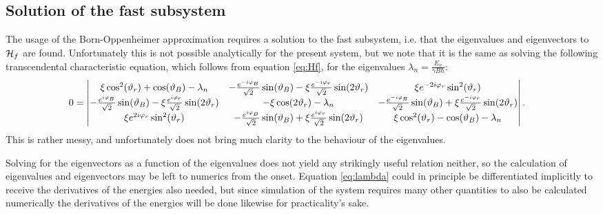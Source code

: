 \documentclass[a4paper]{article}
\begin{document}
\subsection{Solution of the fast subsystem} %
The usage of the Born-Oppenheimer approximation requires a solution to the fast subsystem,
i.e. that the eigenvalues and eigenvectors to \(\mathbb{\cal H}_f\) are found.
Unfortunately this is not possible analytically for the present system, but we note that it
is the same as solving the following transcendental characteristic equation, which follows
from equation \ref{eq:Hf}, for the
eigenvalues \(\lambda_n = \frac{E_n}{\gamma B\hbar{}}\): %
\begin{align}\label{eq:lambda}
        0 &= \mdet{
                 \xi\cos[2](\vartheta_r) + \cos(\vartheta_B) - \lambda_n& -\frac{
                        e^{-i\varphi_B}}{\sqrt{2}
                }\sin(\vartheta_B) - \xi\frac{e^{-i\varphi_r}}{\sqrt{2} }\sin(2\vartheta_r) &
                \xi e^{-2i\varphi_r}\sin[2](\vartheta_r)\\
                 -\frac{e^{i\varphi_B}}{\sqrt{2}}\sin(\vartheta_B) -
                \xi \frac{e^{i\varphi_r}}{\sqrt{2} }\sin(2\vartheta_r) &
                -\xi\cos(2\vartheta_r) - \lambda_n & -\frac{
                e^{-i\varphi_B}}{\sqrt{2} }\sin(\vartheta_B)+ \xi\frac{e^{-i\varphi_r}}{\sqrt{2}
        }\sin(2\vartheta_r)\\
                \xi e^{2i\varphi_r}\sin[2](\vartheta_r) & -\frac{
                e^{i\varphi_B}}{\sqrt{2} }\sin(\vartheta_B) +
                        \xi \frac{e^{i\varphi_r}}{\sqrt{2} }\sin(2\vartheta_r) &
                        \xi \cos[2](\vartheta_r) - \cos(\vartheta_B) - \lambda_n 
        }
.\end{align}
This is rather messy, and unfortunately does not bring much clarity to the behaviour of the
eigenvalues. 

Solving for the eigenvectors as a function of the eigenvalues does not yield any strikingly
useful relation neither, so the calculation of eigenvalues and eigenvectors may be left to numerics from
the onset. Equation \ref{eq:lambda} could in principle be differentiated implicitly to
receive the derivatives of the energies also needed, but since simulation of the system requires many other quantities 
to also be calculated numerically the derivatives of the energies will be done likewise for
practicality's sake.
\end{document}
